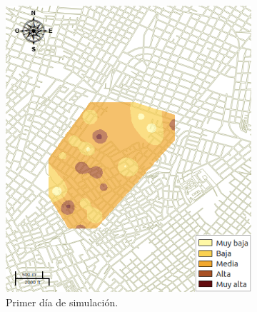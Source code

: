 \begin{figure}[!htbp]
    \centering
    \begin{subfigure}[b]{0.45\textwidth}
            \includegraphics[width=\textwidth]{capitulo-6/graphics/raster/temp-24-0.png}
            \caption{\label{fig:niveles-infestacion-24-a}Primer día de simulación.}
    \end{subfigure}
    ~~
    \begin{subfigure}[b]{0.45\textwidth}

\end{subfigure}
\end{figure}
